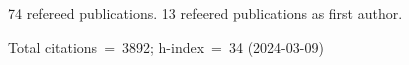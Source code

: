 74 refereed publications. 13 refeered publications as first author.

Total citations~=~3892; h-index~=~34 (2024-03-09)